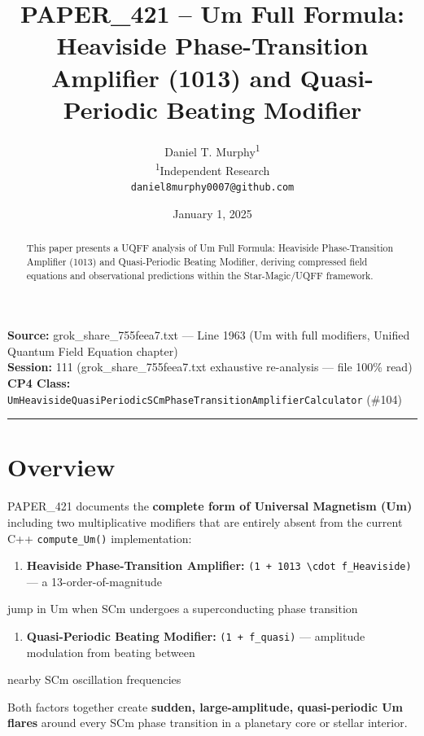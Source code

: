 \documentclass[12pt,a4paper]{article}
\title{\textbf{PAPER\_421 -- Um Full Formula: \\ Heaviside Phase-Transition Amplifier (1013) and Quasi-Periodic Beating Modifier}}
\author{
Daniel T. Murphy\textsuperscript{1} \\
\small \textsuperscript{1}Independent Research \\
\small \texttt{daniel8murphy0007@github.com}
}
\date{January 1, 2025}
\begin{document}
\maketitle

\begin{flushleft}
\textbf{Source:} grok\_{share\_755feea7}.txt --- Line 1963 (Um with full modifiers, Unified Quantum Field Equation chapter) \\
\textbf{Session:} 111 (grok\_{share\_755feea7}.txt exhaustive re-analysis --- file 100\% read) \\
\textbf{CP4 Class:} \texttt{UmHeavisideQuasiPeriodicSCmPhaseTransitionAmplifierCalculator} (\#104) \\
\end{flushleft}

\medskip\hrule\medskip

\begin{abstract}
This paper presents a UQFF analysis of Um Full Formula: Heaviside Phase-Transition Amplifier (1013) and Quasi-Periodic Beating Modifier, deriving compressed field equations and observational predictions within the Star-Magic/UQFF framework.
\end{abstract}

\section{Overview}

PAPER\_421 documents the \textbf{complete form of Universal Magnetism (Um)} including two multiplicative modifiers that are entirely absent from the current C++ \texttt{compute\_Um()} implementation:

\begin{enumerate}
  \item \textbf{Heaviside Phase-Transition Amplifier:} \texttt{(1 + 1013 \textbackslash cdot f\_Heaviside)} --- a 13-order-of-magnitude
\end{enumerate}

jump in Um when SCm undergoes a superconducting phase transition

\begin{enumerate}
  \item \textbf{Quasi-Periodic Beating Modifier:} \texttt{(1 + f\_quasi)} --- amplitude modulation from beating between
\end{enumerate}

nearby SCm oscillation frequencies

Both factors together create \textbf{sudden, large-amplitude, quasi-periodic Um flares} around every SCm phase transition in a planetary core or stellar interior.
\end{document}
